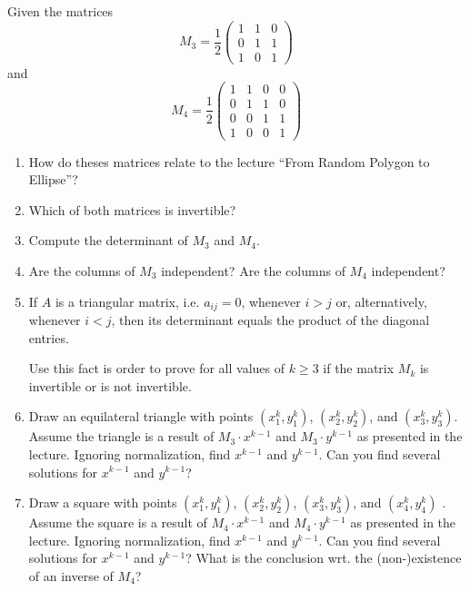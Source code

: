 \documentclass[10pt]{article}
\begin{document}
Given the matrices  \begin{equation*}  M_3 = \frac{1}{2}\left(\begin{array}{ccc}
1 & 1 & 0\\
0 & 1 & 1\\
1 & 0 & 1
\end{array}\right) 
\end{equation*} and \begin{equation*}  M_4 =  \frac{1}{2}\left(\begin{array}{cccc}
1 & 1 & 0 & 0  \\
0 & 1 & 1 & 0  \\
0 & 0 & 1 & 1  \\
1 & 0 & 0 & 1  
\end{array}\right) 
\end{equation*}
\begin{enumerate}
\item How do theses matrices relate to the lecture ``From Random
  Polygon to Ellipse''?
\item Which of both matrices is invertible?
  \item Compute the determinant of $M_3$ and $M_4$.
\item Are the columns of $M_3$ independent? Are the columns of $M_4$
  independent?
\item If $A$ is a triangular matrix, i.e. $a_{ij}=0$, whenever $i>j$
  or, alternatively, whenever $i<j$, then its determinant equals the
  product of the diagonal entries. 

Use this fact is order to prove for
  all values of $k\geq 3$ if the matrix $M_k$ is invertible or is not invertible. 
\item Draw an equilateral triangle with points $(x_1^k, y_1^k)$, $(x_2^k, y_2^k)$, and $(x_3^k, y_3^k)$. Assume the triangle is a result of $M_3\cdot x^{k-1}$ and $M_3\cdot y^{k-1}$ as presented in the lecture. Ignoring normalization, find $x^{k-1}$ and $y^{k-1}$. Can you find several solutions for $x^{k-1}$ and $y^{k-1}$?
\item Draw a square with points $(x_1^k, y_1^k)$, $(x_2^k, y_2^k)$, $(x_3^k, y_3^k)$, and $(x_4^k, y_4^k)$ . Assume the square is a result of $M_4\cdot x^{k-1}$ and $M_4\cdot y^{k-1}$ as presented in the lecture. Ignoring normalization, find $x^{k-1}$ and $y^{k-1}$. Can you find several solutions for $x^{k-1}$ and $y^{k-1}$? What is the conclusion wrt. the (non-)existence of an inverse of $M_4$?
\end{enumerate}
\end{document}
